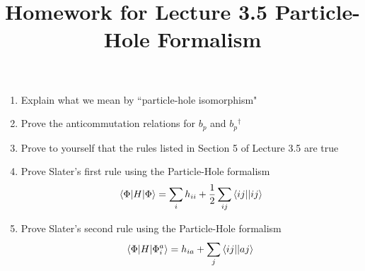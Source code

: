 \documentclass{article}
\title{Homework for Lecture 3.5 Particle-Hole Formalism}
\date{}
\newcommand{\dg}{\ensuremath{^\dagger} }
\begin{document}
\maketitle
\noindent
\begin{enumerate}
\item Explain what we mean by ``particle-hole isomorphism"
\item Prove the anticommutation relations for $b_p$ and $b_p\dg$
\item Prove to yourself that the rules listed in Section 5 of Lecture 3.5 are true
\item Prove Slater's first rule using the Particle-Hole formalism
\[\braket{\Phi|H|\Phi} = \sum_i h_{ii} + \frac{1}{2} \sum_{ij} \braket{ij || ij} \]
\item Prove Slater's second rule using the Particle-Hole formalism 
\[\braket{\Phi|H|\Phi_i^a} = h_{ia} + \sum_{j} \braket{ij || aj} \]
\end{enumerate}
\end{document}
